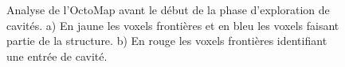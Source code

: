 \begin{figure}[!h]
  \centering
  \hfil
  \caption[Recherche de voxel frontières dans une OctoMap]{
    Analyse de l'OctoMap avant le début de la phase d'exploration de cavités.
    a) En jaune les voxels frontières et en bleu les voxels faisant partie de la structure.
    b) En rouge les voxels frontières identifiant une entrée de cavité.
  }
  \label{fig:ugv_frontier}
\end{figure}

